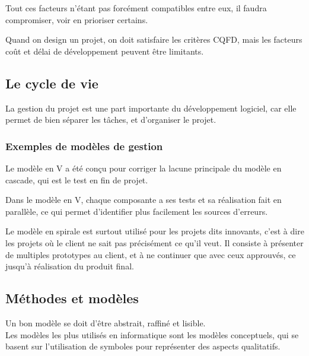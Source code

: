 Tout ces facteurs n'étant pas forcément compatibles entre eux, il faudra compromiser, voir en prioriser certains.

Quand on design un projet, on doit satisfaire les critères CQFD, mais les facteurs coût et délai de développement
peuvent être limitants.

\subsection{Le cycle de vie}

La gestion du projet est une part importante du développement logiciel, car elle permet de bien
séparer les tâches, et d'organiser le projet.

\subsubsection{Exemples de modèles de gestion}
Le modèle en V a été conçu pour corriger la lacune principale du modèle en cascade, qui est le test en
fin de projet.

Dans le modèle en V, chaque composante a ses tests et sa réalisation fait en parallèle, ce qui permet
d'identifier plus facilement les sources d'erreurs.

Le modèle en spirale est surtout utilisé pour les projets dits innovants, c'est à dire les projets où le client
ne sait pas précisément ce qu'il veut. Il consiste à présenter de multiples prototypes au client, et à ne
continuer que avec ceux approuvés, ce jusqu'à réalisation du produit final.

\subsection{Méthodes et modèles}

Un bon modèle se doit d'être abstrait, raffiné et lisible.\\
Les modèles les plus utilisés en informatique sont les modèles conceptuels, qui se basent sur l'utilisation
de symboles pour représenter des aspects qualitatifs.
